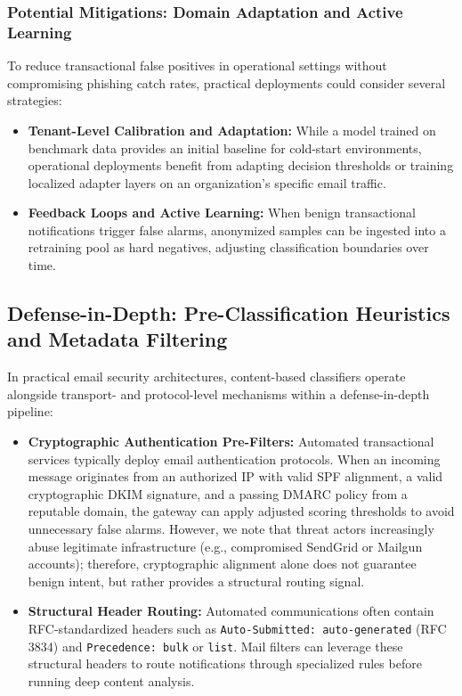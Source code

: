 \documentclass[journal]{IEEEtran}
\begin{document}
\subsubsection{Potential Mitigations: Domain Adaptation and Active Learning}
To reduce transactional false positives in operational settings without compromising phishing catch rates, practical deployments could consider several strategies:
\begin{itemize}
    \item \textbf{Tenant-Level Calibration and Adaptation:} While a model trained on benchmark data provides an initial baseline for cold-start environments, operational deployments benefit from adapting decision thresholds or training localized adapter layers on an organization's specific email traffic.
    \item \textbf{Feedback Loops and Active Learning:} When benign transactional notifications trigger false alarms, anonymized samples can be ingested into a retraining pool as hard negatives, adjusting classification boundaries over time.
\end{itemize}

\subsection{Defense-in-Depth: Pre-Classification Heuristics and Metadata Filtering}
In practical email security architectures, content-based classifiers operate alongside transport- and protocol-level mechanisms within a defense-in-depth pipeline:
\begin{itemize}
    \item \textbf{Cryptographic Authentication Pre-Filters:} Automated transactional services typically deploy email authentication protocols. When an incoming message originates from an authorized IP with valid SPF alignment, a valid cryptographic DKIM signature, and a passing DMARC policy from a reputable domain, the gateway can apply adjusted scoring thresholds to avoid unnecessary false alarms. However, we note that threat actors increasingly abuse legitimate infrastructure (e.g., compromised SendGrid or Mailgun accounts); therefore, cryptographic alignment alone does not guarantee benign intent, but rather provides a structural routing signal.
    \item \textbf{Structural Header Routing:} Automated communications often contain RFC-standardized headers such as \texttt{Auto-Submitted: auto-generated} (RFC 3834) and \texttt{Precedence: bulk} or \texttt{list}. Mail filters can leverage these structural headers to route notifications through specialized rules before running deep content analysis.
\end{itemize}
\end{document}
